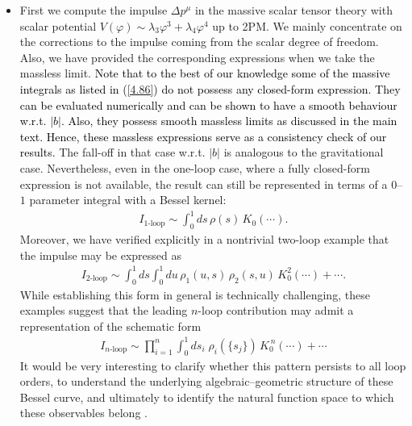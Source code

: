 \begin{itemize}
    \item First we compute the impulse $\Delta p^\mu$ in the massive scalar tensor theory with scalar potential $V(\varphi)\sim \lambda_3 \varphi^3+\lambda_4 \varphi^4$ up to 2PM. We mainly concentrate on the corrections to the impulse coming from the scalar degree of freedom. Also, we have provided the corresponding expressions when we take the massless limit. \textcolor{black}{Note that to the best of our knowledge some of the massive integrals as listed in (\ref{4.86}) do not possess any closed-form expression. They can be evaluated numerically and can be shown to have a smooth behaviour w.r.t. $|b|.$ Also, they possess smooth massless limits as discussed in the main text. Hence, these massless expressions serve as a consistency check of our results.}  The fall-off in that case w.r.t. $|b|$ is analogous to the gravitational case. Nevertheless, even in the one-loop case, where a fully closed-form expression is not available, the result can still be represented in terms of a $0$--$1$ parameter integral with a Bessel kernel:
\begin{align}
    I_{\text{1-loop}}
    \sim
    \int_0^1 ds\, \rho(s)\, K_0(\cdots).\nonumber
\end{align}
Moreover, we have verified explicitly in a nontrivial two-loop example that the impulse may be expressed as
\begin{align}
    I_{\text{2-loop}}
    \sim
    \int_0^1 ds \int_0^1 du\,
    \rho_1(u,s)\,\rho_2(s,u)\,
    K_0^2(\cdots)+\cdots.\nonumber
\end{align}
While establishing this form in general is technically challenging, these examples suggest that the leading $n$-loop contribution may admit a representation of the schematic form
\begin{align}
    I_{\text{$n$-loop}}
    \sim
    \prod_{i=1}^{n}\int_0^1 ds_i\;
    \rho_i(\{s_j\})\, K_0^{\,n}(\cdots)+\cdots\nonumber
\end{align}
It would be very interesting to clarify whether this pattern persists to all loop orders, to understand the underlying algebraic--geometric structure of these Bessel curve, and ultimately to identify the natural function space to which these observables belong \cite{Zhou:2018tva}.


\end{itemize}
